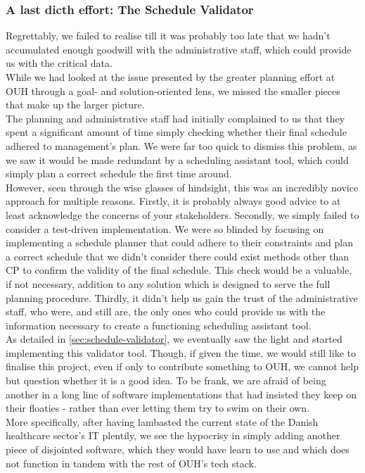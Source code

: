 \subsubsection*{A last dicth effort: The Schedule Validator}
Regrettably, we failed to realise till it was probably too late that we hadn't accumulated enough goodwill with the administrative staff, which could provide us with the critical data. 
\\
While we had looked at the issue presented by the greater planning effort at OUH through a goal- and solution-oriented lens, we missed the smaller pieces that make up the larger picture.
\\
The planning and administrative staff had initially complained to us that they spent a significant amount of time simply checking whether their final schedule adhered to management's plan. We were far too quick to dismiss this problem, as we saw it would be made redundant by a scheduling assistant tool, which could simply plan a correct schedule the first time around.
\\
However, seen through the wise glasses of hindsight, this was an incredibly novice approach for multiple reasons. Firstly, it is probably always good advice to at least acknowledge the concerns of your stakeholders. Secondly, we simply failed to consider a test-driven implementation. We were so blinded by focusing on implementing a schedule planner that could adhere to their constraints and plan a correct schedule that we didn't consider there could exist methods other than CP to confirm the validity of the final schedule. This check would be a valuable, if not necessary, addition to any solution which is designed to serve the full planning procedure. Thirdly, it didn't help us gain the trust of the administrative staff, who were, and still are, the only ones who could provide us with the information necessary to create a functioning scheduling assistant tool. 
\\
As detailed in \autoref{sec:schedule-validator}, we eventually saw the light and started implementing this validator tool. Though, if given the time, we would still like to finalise this project, even if only to contribute something to OUH, we cannot help but question whether it is a good idea. To be frank, we are afraid of being another in a long line of software implementations that had insisted they keep on their floaties - rather than ever letting them try to swim on their own.
\\
More specifically, after having lambasted the current state of the Danish healthcare sector's IT plentily, we see the hypocrisy in simply adding another piece of disjointed software, which they would have learn to use and which does not function in tandem with the rest of OUH's tech stack.

